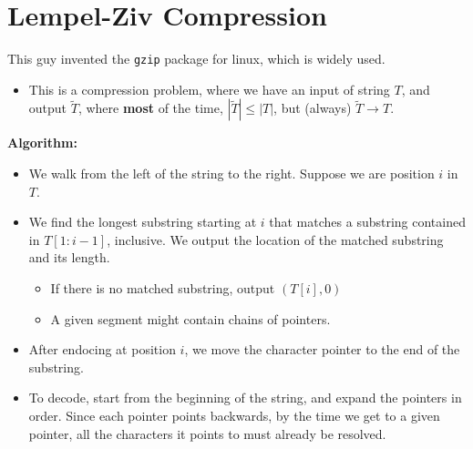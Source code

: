 \documentclass[10pt]{article}
\begin{document}
\section*{Lempel-Ziv Compression}
This guy invented the \texttt{gzip} package for linux, which is widely used.
\begin{itemize}
	\item This is a compression problem, where we have an input of string $T$, and output $\tilde{T}$, where \textbf{most} of the time, $|\tilde{T}| \leq |T|$, but (always) $\tilde{T} \rightarrow T$.
\end{itemize}
\textbf{Algorithm:}
\begin{itemize}
	\item We walk from the left of the string to the right.  Suppose we are position $i$ in $T$.
	\item We find the longest substring starting at $i$ that matches a substring contained in $T[1:i - 1]$, inclusive.  We output the location of the matched substring and its length.
	\begin{itemize}
	    \item If there is no matched substring, output $(T[i], 0)$
	    \item A given segment might contain chains of pointers.
    \end{itemize}
    \item After endocing at position $i$, we move the character pointer to the end of the substring.
    \item To decode, start from the beginning of the string, and expand the pointers in order.  Since each pointer points backwards, by the time we get to a given pointer, all the characters it points to must already be resolved.
\end{itemize}
\end{document}
